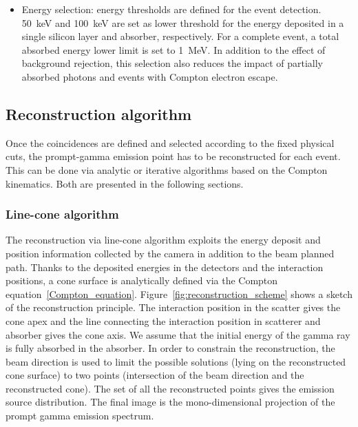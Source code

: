 \begin{itemize}
\item Energy selection: energy thresholds are defined for the event detection. 50~keV and 100~keV are set as lower threshold for the energy deposited in a single silicon layer and absorber, respectively. For a complete event, a total absorbed energy lower limit is set to 1~MeV. In addition to the effect of background rejection, this selection also reduces the impact of partially absorbed photons and events with Compton electron escape.

\end{itemize}

\subsection{Reconstruction algorithm}

Once the coincidences are defined and selected according to the fixed physical cuts, the prompt-gamma emission point has to be reconstructed for each event. This can be done via analytic or iterative algorithms based on the Compton kinematics. Both are presented in the following sections.


\subsubsection{Line-cone algorithm}
The reconstruction via line-cone algorithm exploits the energy deposit and position information collected by the camera in addition to the beam planned path. Thanks to the deposited energies in the detectors and the interaction positions, a cone surface is analytically defined via the Compton equation~\ref{Compton_equation}. Figure~\ref{fig:reconstruction_scheme} shows a sketch of the reconstruction principle. The interaction position in the scatter gives the cone apex and the line connecting the interaction position in scatterer and absorber gives the cone axis. We assume that the initial energy of the gamma ray is fully absorbed in the absorber. In order to constrain the reconstruction, the beam direction is used to limit the possible solutions (lying on the reconstructed cone surface) to two points (intersection of the beam direction and the reconstructed cone). The set of all the reconstructed points gives the emission source distribution. The final image is the mono-dimensional projection of the prompt gamma emission spectrum. 

